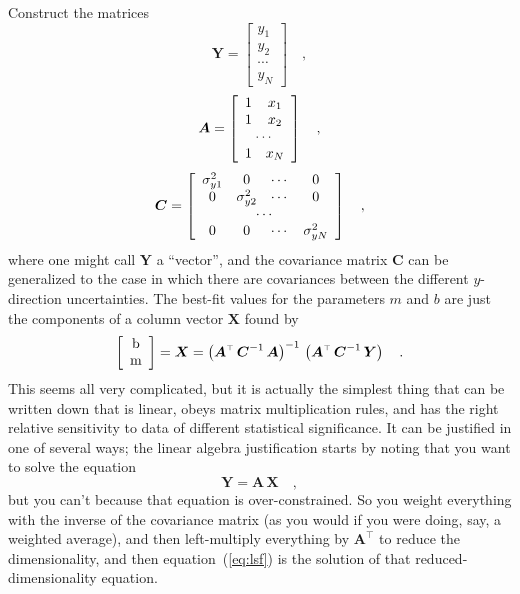 \documentclass[12pt]{article}
\newcommand{\mmatrix}[1]{\boldsymbol{#1}}
\newcommand{\inverse}[1]{{#1}^{-1}}
\newcommand{\transpose}[1]{{#1}^{\scriptscriptstyle \top}}
\newcommand{\mA}{\mmatrix{A}}
\newcommand{\mAT}{\transpose{\mA}}
\newcommand{\mC}{\mmatrix{C}}
\newcommand{\mCinv}{\inverse{\mC}}
\newcommand{\mX}{\mmatrix{X}}
\newcommand{\mY}{\mmatrix{Y}}
\begin{document}
Construct the matrices
\begin{equation}
\mY = \left[\begin{array}{c}
y_1 \\
y_2 \\
\cdots \\
y_N
\end{array}\right] \quad ,
\end{equation}
\begin{equation}
\mA = \left[\begin{array}{cc}
1 & x_1 \\
1 & x_2 \\
\multicolumn{2}{c}{\cdots} \\
1 & x_N
\end{array}\right] \quad ,
\end{equation}
\begin{equation}
\mC = \left[\begin{array}{cccc}
\sigma_{y1}^{2} & 0 & \cdots & 0 \\
0 & \sigma_{y2}^{2} & \cdots & 0 \\
\multicolumn{4}{c}{\cdots} \\
0 & 0 & \cdots & \sigma_{yN}^{2}
\end{array}\right] \quad ,
\end{equation}
where one might call $\mY$ a ``vector'', and the covariance matrix
$\mC$ can be generalized to the case in which there are covariances
between the different $y$-direction uncertainties.  The best-fit
values for the parameters $m$ and $b$ are just the components of a
column vector $\mX$ found by
\begin{equation}\label{eq:lsf}
\left[\begin{array}{c} $b$ \\ $m$ \end{array}\right]
 = \mX = \inverse{\left(\mAT\,\mCinv\,\mA\right)}
  \,\left(\mAT\,\mCinv\,\mY\right) \quad .
\end{equation}
This seems all very complicated, but it is actually the simplest thing
that can be written down that is linear, obeys matrix multiplication
rules, and has the right relative sensitivity to data of different
statistical significance.  It can be justified in one of several ways;
the linear algebra justification starts by noting that you want to
solve the equation
\begin{equation}
\mY = \mA\,\mX \quad ,
\end{equation}
but you can't because that equation is over-constrained.  So you
weight everything with the inverse of the covariance matrix (as you
would if you were doing, say, a weighted average), and then
left-multiply everything by $\mAT$ to reduce the dimensionality, and
then equation~(\ref{eq:lsf}) is the solution of that
reduced-dimensionality equation.
\end{document}
